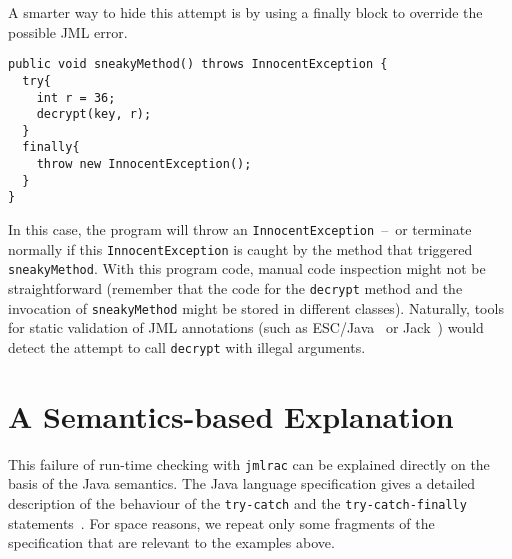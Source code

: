 \documentclass[]{llncs}
\begin{document}
A smarter way to hide this attempt is by using a finally block to
override the possible JML error.
\begin{verbatim}
public void sneakyMethod() throws InnocentException {
  try{ 
    int r = 36; 
    decrypt(key, r);                                           
  }           
  finally{
    throw new InnocentException();
  }
}
\end{verbatim}
In this case, the program will throw an
\texttt{InnocentException}~--~or terminate normally if this
\texttt{InnocentException} is caught by the method that triggered
\texttt{sneakyMethod}. With this program code, manual code inspection
might not be straightforward (remember that the code for the
\texttt{decrypt} method and the invocation of \texttt{sneakyMethod}
might be stored in different classes). Naturally, tools for static
validation of JML annotations (such as ESC/Java~\cite{CokK04} or
Jack~\cite{BartheBCGHLPR07:FMCO}) would detect the attempt to call
\texttt{decrypt} with illegal arguments.

\section{A Semantics-based Explanation}\label{SecExplanation}

This failure of run-time checking with \texttt{jmlrac} can be explained
directly on the basis of the Java semantics. The Java language
specification gives a detailed description of the behaviour of the
\texttt{try-catch} and the 
\texttt{try-catch-finally} statements~\cite[\S
14.20]{GoslingJSB05}. For space reasons, we repeat only some fragments of
the specification that are relevant to the examples above.
\end{document}
